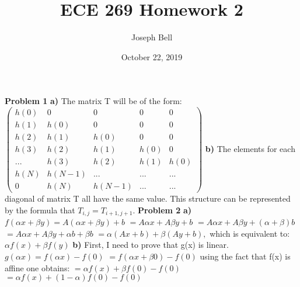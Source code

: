 \documentclass[12pt]{article}
\begin{document}
\title{ECE 269 Homework 2}
\author{Joseph Bell}
\date{October 22, 2019}
\maketitle
\textbf{Problem 1}
\newline
\textbf{a)}
\newline
The matrix T will be of the form:
\newline
\newline
$\left(\begin{array}{ccccc} h(0) & 0 & 0 & 0& 0  \\ h(1) & h(0) & 0 & 0 & 0  \\ h(2) & h(1) & h(0) & 0 & 0 \\ h(3) & h(2) & h(1) & h(0) & 0 \\ ... & h(3) & h(2) & h(1) & h(0) \\ h(N) & h(N-1) & ... & ... & ... \\ 0 & h(N) & h(N-1) & ... & ...  \end{array}\right)$
\newline
\newline
\textbf{b)}
\newline
The elements for each diagonal of matrix T all have the same value. This structure can be represented by the formula that $T_{i,j} = T_{i+1,j+1}$.
\newline
\textbf{Problem 2}
\newline
\textbf{a)}
\newline
$f(\alpha x + \beta y) = A (\alpha x + \beta y) + b$
\newline
$= A \alpha x + A \beta y + b$
\newline
$= A \alpha x + A \beta y + (\alpha + \beta)b$
\newline
$= A \alpha x + A \beta y + \alpha b + \beta b$
$= \alpha (Ax + b) + \beta(Ay + b),$ which is equivalent to: $\alpha f(x) + \beta f(y)$
\newline
\newline
\textbf{b)}
\newline
First, I need to prove that g(x) is linear.
\newline
$g(\alpha x) = f(\alpha x) - f(0)$
\newline
$= f(\alpha x + \beta 0) - f(0)$ using the fact that f(x) is affine one obtains:
\newline
$= \alpha f(x) + \beta f(0) - f(0)$
\newline
$= \alpha f(x) + (1-\alpha)f(0) - f(0)$
\newline
\end{document}
